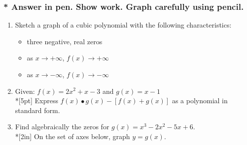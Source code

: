\documentclass[12pt, twoside]{article}
\begin{document}

\subsubsection*{\\* \textnormal{Answer in pen. Show work. Graph carefully using pencil.}}

\begin{enumerate}


\item Sketch a graph of a cubic polynomial with the following characteristics:
\begin{itemize}
\item three negative, real zeros
\item as $x \rightarrow + \infty$, $f(x) \rightarrow + \infty$
\item as $x \rightarrow - \infty$, $f(x) \rightarrow - \infty$
\end{itemize}
\begin{center}
\end{center} %

\item Given: $f(x)=2x^2+ x - 3$ and $g(x)=x-1$\\*[5pt]
Express $f(x) \bullet g(x) - [f(x) + g(x)]$ as a polynomial in standard form. \\[3in]%

\newpage
\item Find algebraically the zeros for  $g(x)=x^3-2x^2-5x+6$.\\*[2in]
On the set of axes below, graph $y=g(x)$.
\begin{center}
\end{center} %


\end{enumerate}
\end{document}
